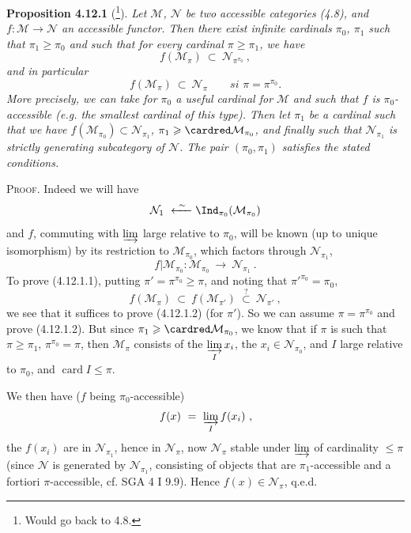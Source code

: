 \textbf{Proposition 4.12.1} (\footnote{Would go back to 4.8.}). \textit{Let $\mathcal{M}$, $\mathcal{N}$ be two accessible categories (4.8), and $f : \mathcal{M} \longrightarrow \mathcal{N}$ an accessible functor. Then there exist infinite cardinals $\pi_0$, $\pi_1$ such that $\pi_1 \geqslant \pi_0$ and such that for every cardinal $\pi \geqslant \pi_1$, we have}
\[
f(\mathcal{M}_\pi) \ \subset \ \mathcal{N}_{\pi^{\pi_0}} \ , \tag*{(4.12.1)} %
\]
\textit{and in particular}
\[
f(\mathcal{M}_\pi) \ \subset \ \mathcal{N}_\pi \qquad \textit{si } \pi = \pi^{\pi_0}. \tag*{(4.12.1.2)}
\]
\textit{More precisely, we can take for $\pi_0$ a useful cardinal for $\mathcal{M}$}  \textit{and such that $f$ is $\pi_0$-accessible (e.g. the smallest cardinal of this type). Then let $\pi_1$ be a cardinal such that we have $f(\mathcal{M}_{\pi_0}) \subset \mathcal{N}_{\pi_1}$, $\pi_1 \geqslant \cardred \mathcal{M}_{\pi_0}$, and finally such that $\mathcal{N}_{\pi_1}$ is} \textit{strictly generating subcategory of $\mathcal{N}$. The pair $(\pi_0,\pi_1)$ satisfies the stated conditions.}

\textsc{Proof}. Indeed we will have
\[
\mathcal{N}_1 \ \xleftarrow{\ \sim\ } \Ind_{\pi_0}(\mathcal{M}_{\pi_0})
\]
and $f$, commuting with $\varinjlim$ large relative to $\pi_0$, will be known (up to unique isomorphism) by its restriction to $\mathcal{M}_{\pi_0}$, which factors through $\mathcal{N}_{\pi_1}$,
\[
f|\mathcal{M}_{\pi_0} : \mathcal{M}_{\pi_0} \ \longrightarrow \ \mathcal{N}_{\pi_1} \ .
\]
To prove (4.12.1.1), putting $\pi' = \pi^{\pi_0} \geqslant \pi$, and noting that $\pi'^{\pi_0} = \pi_0$,
\[
f(\mathcal{M}_\pi) \ \subset \ f(\mathcal{M}_{\pi'}) \ \overset{?}{\subset} \ \mathcal{N}_{\pi'} \ ,
\]
we see that it suffices to prove (4.12.1.2) (for $\pi'$). So we can assume $\pi = \pi^{\pi_0}$ and prove (4.12.1.2). But since $\pi_1 \geqslant \cardred \mathcal{M}_{\pi_0}$, we know that if $\pi$ is such that $\pi \geqslant \pi_1$, $\pi^{\pi_0} = \pi$, then $\mathcal{M}_\pi$ consists of the $\varinjlim\limits_{I} x_i$, the $x_i \in \mathcal{N}_{\pi_0}$, and $I$ large relative to $\pi_0$, and $\operatorname{card} I \leqslant \pi$.


We then have ($f$ being $\pi_0$-accessible)
\[
f(x) \ = \ \varinjlim_{I} f(x_i) \ ,
\]
the $f(x_i)$ are in $\mathcal{N}_{\pi_1}$, hence in $\mathcal{N}_\pi$, now $\mathcal{N}_\pi$ stable under $\varinjlim$ of cardinality $\leqslant \pi$ (since $\mathcal{N}$ is generated by $\mathcal{N}_{\pi_1}$, consisting of objects that are $\pi_1$-accessible and a fortiori $\pi$-accessible, cf. SGA 4 I 9.9). Hence $f(x) \in \mathcal{N}_\pi$, q.e.d.

